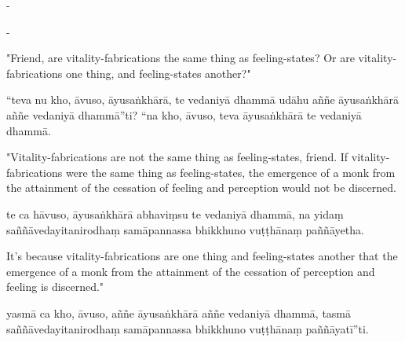 \begin{samepage}
\begin{leftcolumn*}
-
\end{leftcolumn*}

\begin{rightcolumn}
-
\end{rightcolumn}
\end{samepage}

\begin{samepage}
\begin{leftcolumn*}
"Friend, are vitality-fabrications the same thing as feeling-states?
Or are vitality-fabrications one thing, and feeling-states another?"
\end{leftcolumn*}

\begin{rightcolumn}
“teva nu kho, āvuso, āyusaṅkhārā, te vedaniyā dhammā udāhu aññe āyusaṅkhārā aññe vedaniyā dhammā”ti?
“na kho, āvuso, teva āyusaṅkhārā te vedaniyā dhammā.
\end{rightcolumn}
\end{samepage}

\begin{samepage}
\begin{leftcolumn*}
"Vitality-fabrications are not the same thing as feeling-states, friend. If vitality-fabrications were the same thing as feeling-states, the emergence of a monk from the attainment of the cessation of feeling and perception would not be discerned.
\end{leftcolumn*}

\begin{rightcolumn}
te ca hāvuso, āyusaṅkhārā abhaviṃsu te vedaniyā dhammā, na yidaṃ saññāvedayitanirodhaṃ samāpannassa bhikkhuno vuṭṭhānaṃ paññāyetha.
\end{rightcolumn}
\end{samepage}

\begin{samepage}
\begin{leftcolumn*}
It's because vitality-fabrications are one thing and feeling-states another that the emergence of a monk from the attainment of the cessation of perception and feeling is discerned."
\end{leftcolumn*}

\begin{rightcolumn}
yasmā ca kho, āvuso, aññe āyusaṅkhārā aññe vedaniyā dhammā, tasmā saññāvedayitanirodhaṃ samāpannassa bhikkhuno vuṭṭhānaṃ paññāyatī”ti.
\end{rightcolumn}
\end{samepage}

